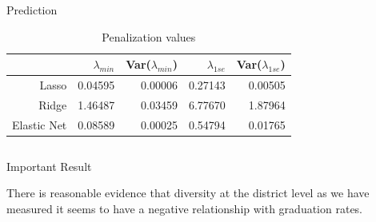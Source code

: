\documentclass[final]{beamer}
\newlength{\onecolwid}
\newlength{\twocolwid}
\begin{document}
\begin{frame}[t]
\begin{columns}[t]
\begin{column}{\twocolwid}
\begin{columns}[t,totalwidth=\twocolwid]
\begin{column}{\onecolwid}
\begin{block}{Prediction}
\begin{table}[ht]
\caption{Penalization values}
\label{lambda}
\centering
\begin{tabular}{r|rrrr}
  \hline
 & $\lambda_{min}$ & Var($\lambda_{min}$) & $\lambda_{1se}$ & Var($\lambda_{1se}$) \\ 
  \hline
Lasso & 0.04595 & 0.00006 & 0.27143 & 0.00505 \\ 
  Ridge & 1.46487 & 0.03459 & 6.77670 & 1.87964 \\ 
  Elastic Net & 0.08589 & 0.00025 & 0.54794 & 0.01765 \\ 
   \hline
\end{tabular}
\end{table}

\end{block}


\end{column} %

\end{columns} %



\begin{alertblock}{Important Result}

There is reasonable evidence that diversity at the district level as we have measured it seems to have a negative relationship with graduation rates.

\end{alertblock} 


\begin{columns}[t,totalwidth=\twocolwid] %

\begin{column}{\onecolwid} %



\end{column}
\end{columns}
\end{column}
\end{columns}
\end{frame}
\end{document}
